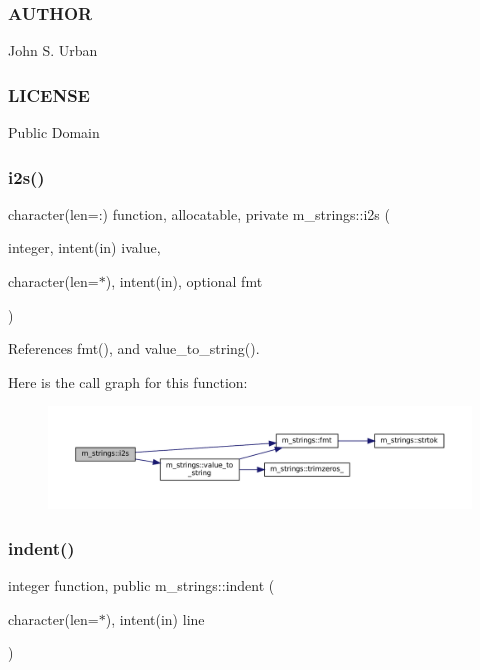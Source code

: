 \subsubsection*{A\+U\+T\+H\+OR}

John S. Urban \subsubsection*{L\+I\+C\+E\+N\+SE}

Public Domain \mbox{\label{namespacem__strings_a76d3a650fbfec1f65d8fd81042347408}} 
\subsubsection{\texorpdfstring{i2s()}{i2s()}}
{\footnotesize\ttfamily character(len=\+:) function, allocatable, private m\+\_\+strings\+::i2s (\begin{DoxyParamCaption}\item[{integer, intent(in)}]{ivalue,  }\item[{character(len=$\ast$), intent(in), optional}]{fmt }\end{DoxyParamCaption})\hspace{0.3cm}{\ttfamily [private]}}



References fmt(), and value\+\_\+to\+\_\+string().

Here is the call graph for this function\+:\nopagebreak
\begin{figure}[H]
\begin{center}
\leavevmode
\includegraphics[width=350pt]{namespacem__strings_a76d3a650fbfec1f65d8fd81042347408_cgraph}
\end{center}
\end{figure}
\mbox{\label{namespacem__strings_a020dcca7f01d33eedf28b17518a22b69}} 
\subsubsection{\texorpdfstring{indent()}{indent()}}
{\footnotesize\ttfamily integer function, public m\+\_\+strings\+::indent (\begin{DoxyParamCaption}\item[{character(len=$\ast$), intent(in)}]{line }\end{DoxyParamCaption})}



